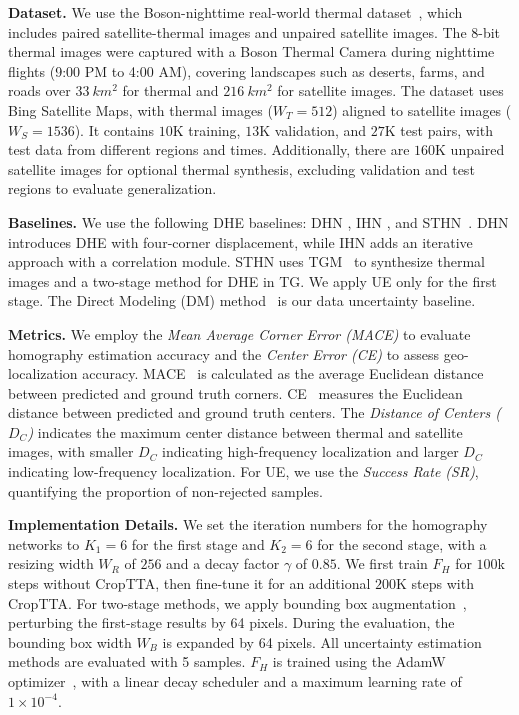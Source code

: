 \textbf{Dataset.} We use the Boson-nighttime real-world thermal dataset~\cite{stl, STHN}, which includes paired satellite-thermal images and unpaired satellite images. The 8-bit thermal images were captured with a Boson Thermal Camera during nighttime flights (9:00 PM to 4:00 AM), covering landscapes such as deserts, farms, and roads over $33~\si{km^2}$ for thermal and $216~\si{km^2}$ for satellite images. The dataset uses Bing Satellite Maps, with thermal images ($W_T=512$) aligned to satellite images ($W_S=1536$). It contains $10$K training, $13$K validation, and $27$K test pairs, with test data from different regions and times. Additionally, there are $160$K unpaired satellite images for optional thermal synthesis, excluding validation and test regions to evaluate generalization.



\textbf{Baselines.} We use the following DHE baselines: DHN \cite{detone2016deep}, IHN \cite{cao2022iterative}, and STHN~\cite{STHN}. DHN introduces DHE with four-corner displacement, while IHN adds an iterative approach with a correlation module. STHN uses TGM~\cite{stl} to synthesize thermal images and a two-stage method for DHE in TG. We apply UE only for the first stage. The Direct Modeling (DM) method~\cite{feng2021review} is our data uncertainty baseline.

\textbf{Metrics.} We employ the \textit{Mean Average Corner Error (MACE)} to evaluate homography estimation accuracy and the \textit{Center Error (CE)} to assess geo-localization accuracy. MACE~\cite{detone2016deep, cao2022iterative} is calculated as the average Euclidean distance between predicted and ground truth corners. CE~\cite{STHN} measures the Euclidean distance between predicted and ground truth centers. The \textit{Distance of Centers ($D_C$)} indicates the maximum center distance between thermal and satellite images, with smaller $D_C$ indicating high-frequency localization and larger $D_C$ indicating low-frequency localization. For UE, we use the \textit{Success Rate (SR)}, quantifying the proportion of non-rejected samples.



\textbf{Implementation Details.}\label{imp}
We set the iteration numbers for the homography networks to $K_1=6$ for the first stage and $K_2=6$ for the second stage, with a resizing width $W_R$ of $256$ and a decay factor $\gamma$ of $0.85$. We first train $F_H$ for $100$k steps without CropTTA, then fine-tune it for an additional $200$K steps with CropTTA. For two-stage methods, we apply bounding box augmentation~\cite{STHN}, perturbing the first-stage results by 64 pixels. During the evaluation, the bounding box width $W_B$ is expanded by 64 pixels. All uncertainty estimation methods are evaluated with 5 samples. $F_H$ is trained using the AdamW optimizer~\cite{loshchilov2017decoupled}, with a linear decay scheduler and a maximum learning rate of $1\times10^{-4}$.
\vspace{-5pt}

